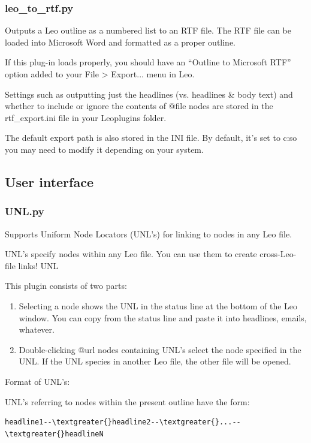 \documentclass[a4paper,10pt,english]{sphinxmanual}
\begin{document}
\subsubsection{leo\_to\_rtf.py}
\label{plugins:leo-to-rtf-py}
Outputs a Leo outline as a numbered list to an RTF file. The RTF file can be
loaded into Microsoft Word and formatted as a proper outline.

If this plug-in loads properly, you should have an ``Outline to Microsoft RTF''
option added to your File \textgreater{} Export... menu in Leo.

Settings such as outputting just the headlines (vs. headlines \& body text) and whether
to include or ignore the contents of @file nodes are stored in the rtf\_export.ini file
in your Leoplugins folder.

The default export path is also stored in the INI file. By default, it's set to c:so
you may need to modify it depending on your system.


\subsection{User interface}
\label{plugins:user-interface}

\subsubsection{UNL.py}
\label{plugins:unl-py}
Supports Uniform Node Locators (UNL's) for linking to nodes in any Leo file.

UNL's specify nodes within any Leo file. You can use them to create
cross-Leo-file links! UNL

This plugin consists of two parts:
\begin{enumerate}
\item {} 
Selecting a node shows the UNL in the status line at the bottom of the Leo
window. You can copy from the status line and paste it into headlines, emails,
whatever.

\item {} 
Double-clicking @url nodes containing UNL's select the node specified in the
UNL. If the UNL species in another Leo file, the other file will be opened.

\end{enumerate}

Format of UNL's:

UNL's referring to nodes within the present outline have the form:

\begin{Verbatim}[commandchars=\\\{\}]
headline1--\textgreater{}headline2--\textgreater{}...--\textgreater{}headlineN
\end{Verbatim}
\end{document}
